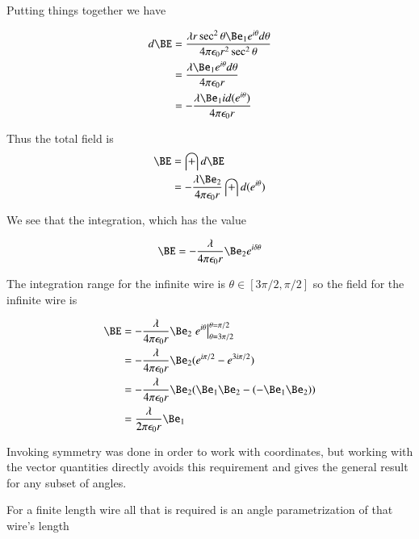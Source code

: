 Putting things together we have

\begin{align*}
d\BE
&= \frac{\lambda r \sec^2 \theta \Be_1 e^{i\theta} d\theta}{4 \pi \epsilon_0 r^2 \sec^2 \theta} \\
&= \frac{\lambda \Be_1 e^{i\theta} d\theta}{4 \pi \epsilon_0 r} \\
&= -\frac{\lambda \Be_1 i d(e^{i\theta})}{4 \pi \epsilon_0 r} \\
\end{align*}

Thus the total field is
\begin{align*}
\BE
&= \int d\BE \\
&= -\frac{\lambda \Be_2}{4 \pi \epsilon_0 r} \int d(e^{i\theta}) \\
\end{align*}

We see that the integration, which has the value

\begin{align}
\BE = -\frac{\lambda} {4 \pi \epsilon_0 r} \Be_2 e^{i\delta\theta}
\end{align}

The integration range for the infinite wire is $\theta \in [3\pi/2, \pi/2]$
so the field for the infinite wire is

\begin{align*}
\BE
&= -\frac{\lambda} {4 \pi \epsilon_0 r} \Be_2 \left. e^{i\theta} \right\vert^{\theta = \pi/2}_{\theta = 3\pi/2} \\
&= -\frac{\lambda} {4 \pi \epsilon_0 r} \Be_2 (e^{i\pi/2} - e^{3i\pi/2}) \\
&= -\frac{\lambda} {4 \pi \epsilon_0 r} \Be_2 (\Be_1 \Be_2 - (-\Be_1 \Be_2)) \\
&= \frac{\lambda} {2 \pi \epsilon_0 r} \Be_1 \\
\end{align*}


Invoking symmetry was done in order to work with coordinates, but working with the vector quantities directly
avoids this requirement and gives the general result for any subset of angles.

For a finite length wire all that is required is an angle parametrization of that wire's length

